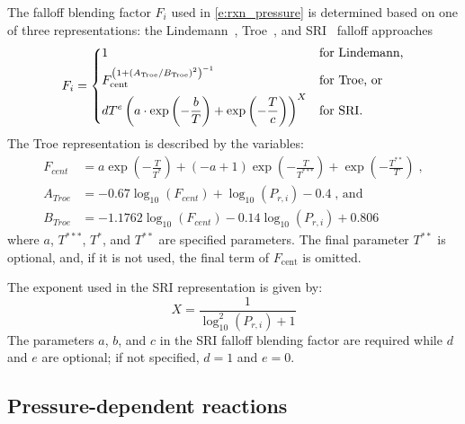 \documentclass[12pt]{article}
\begin{document}
The falloff blending factor $F_i$ used in \cref{e:rxn_pressure} is determined based on one of three representations: the Lindemann~\cite{Lindemann:1922cz}, Troe~\cite{Gilbert:1983bb}, and SRI~\cite{Stewart:1989gj} falloff approaches
\begin{equation}
\label{e:fi}
F_i = \begin{dcases}
1 &\text{for Lindemann,} \\
F_{\text{cent}}^{ \left( 1 + ( A_{\text{Troe}} / B_{\text{Troe}} )^2 \right)^{-1} } &\text{for Troe, or} \\ 
d T^e \left( a \cdot \exp \left( -\frac{b}{T} \right) + \exp \left( -\frac{T}{c} \right) \right)^X &\text{for SRI.} 
\end{dcases}
\end{equation}
The Troe representation is described by the variables:
\begin{align}
 F_{cent} &= a \operatorname{exp}\left({- \frac{T}{T^{*}}}\right) + \left(- a + 1\right) \operatorname{exp}\left({- \frac{T}{T^{***}}}\right) + \operatorname{exp}\left({- \frac{T^{**}}{T}}\right) \;, \\
 A_{Troe} &= - 0.67 \log_{10}{\left (F_{cent} \right )} + \log_{10}{\left (P_{r, i} \right )} - 0.4 \;\text{, and}\\
 B_{Troe} &= - 1.1762 \log_{10}{\left (F_{cent} \right )} - 0.14 \log_{10}{\left (P_{r, i} \right )} + 0.806
\end{align}
where $a$, $T^{***}$, $T^*$, and $T^{**}$ are specified parameters.
The final parameter $T^{**}$ is optional, and, if it is not used, the final term of $F_{\text{cent}}$ is omitted.

The exponent used in the SRI representation is given by:
\begin{equation}
 X = \frac{1}{\log_{10}^{2}{\left (P_{r, i} \right )} + 1}
\end{equation}
The parameters $a$, $b$, and $c$ in the SRI falloff blending factor are required while $d$ and $e$ are optional; if not specified, $d = 1$ and $e = 0$.

\subsection{Pressure-dependent reactions}
\label{s:pdep}
\end{document}

